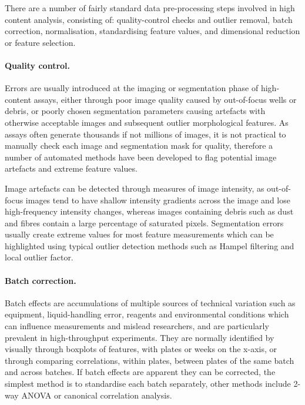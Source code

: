 \documentclass[a4paper,11pt,twoside,openright]{scrbook}
\begin{document}
There are a number of fairly standard data pre-processing steps involved in high content analysis, consisting of: quality-control checks and outlier removal, batch correction, normalisation, standardising feature values, and dimensional reduction or feature selection. \cite{Caicedo2017}


\paragraph{Quality control.}
Errors are usually introduced at the imaging or segmentation phase of high-content assays, either through poor image quality caused by out-of-focus wells or debris, or poorly chosen segmentation parameters causing artefacts with otherwise acceptable images and subsequent outlier morphological features.
As assays often generate thousands if not millions of images, it is not practical to manually check each image and segmentation mask for quality, therefore a number of automated methods have been developed to flag potential image artefacts and extreme feature values.

Image artefacts can be detected through measures of image intensity, as out-of-focus images tend to have shallow intensity gradients across the image and lose high-frequency intensity changes, \cite{Bray2012} whereas images containing debris such as dust and fibres contain a large percentage of saturated pixels.
Segmentation errors usually create extreme values for most feature measurements which can be highlighted using typical outlier detection methods such as Hampel filtering \cite{Hampel1974} and local outlier factor. \cite{Breunig2000}

\paragraph{Batch correction.}
Batch effects are accumulations of multiple sources of technical variation such as equipment, liquid-handling error, reagents and environmental conditions which can influence measurements and mislead researchers, and are particularly prevalent in high-throughput experiments.
They are normally identified by visually through boxplots of features, with plates or weeks on the x-axis, or through comparing correlations, within plates, between plates of the same batch and across batches.
If batch effects are apparent they can be corrected, the simplest method is to standardise each batch separately, other methods include 2-way ANOVA \cite{Nygaard2016} or canonical correlation analysis. \cite{Vaisipour2014}
\end{document}
